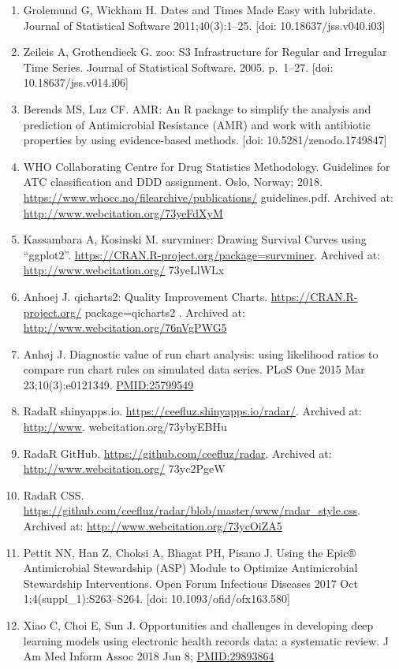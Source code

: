 \documentclass[
]{book}
\begin{document}
\begin{enumerate}
\item
  Grolemund G, Wickham H. Dates and Times Made Easy with lubridate. Journal of Statistical Software 2011;40(3):1--25. {[}doi: 10.18637/jss.v040.i03{]}
\item
  Zeileis A, Grothendieck G. zoo: S3 Infrastructure for Regular and Irregular Time Series. Journal of Statistical Software. 2005. p.~1--27. {[}doi: 10.18637/jss.v014.i06{]}
\item
  Berends MS, Luz CF. AMR: An R package to simplify the analysis and prediction of Antimicrobial Resistance (AMR) and work with antibiotic properties by using evidence-based methods. {[}doi: 10.5281/zenodo.1749847{]}
\item
  WHO Collaborating Centre for Drug Statistics Methodology. Guidelines for ATC classification and DDD assignment. Oslo, Norway; 2018. \url{https://www.whocc.no/filearchive/publications/} guidelines.pdf. Archived at: \url{http://www.webcitation.org/73yeFdXyM}
\item
  Kassambara A, Kosinski M. survminer: Drawing Survival Curves using ``ggplot2''. \url{https://CRAN.R-project.org/package=survminer}. Archived at: \url{http://www.webcitation.org/} 73yeLlWLx
\item
  Anhoej J. qicharts2: Quality Improvement Charts. \url{https://CRAN.R-project.org/} package=qicharts2 . Archived at: \url{http://www.webcitation.org/76nVgPWG5}
\item
  Anhøj J. Diagnostic value of run chart analysis: using likelihood ratios to compare run chart rules on simulated data series. PLoS One 2015 Mar 23;10(3):e0121349. \url{PMID:25799549}
\item
  RadaR shinyapps.io. \url{https://ceefluz.shinyapps.io/radar/}. Archived at: \url{http://www}. webcitation.org/73ybyEBHu
\item
  RadaR GitHub. \url{https://github.com/ceefluz/radar}. Archived at: \url{http://www.webcitation.org/} 73yc2PgeW
\item
  RadaR CSS. \url{https://github.com/ceefluz/radar/blob/master/www/radar_style.css}. Archived at: \url{http://www.webcitation.org/73ycOiZA5}
\item
  Pettit NN, Han Z, Choksi A, Bhagat PH, Pisano J. Using the Epic® Antimicrobial Stewardship (ASP) Module to Optimize Antimicrobial Stewardship Interventions. Open Forum Infectious Diseases 2017 Oct 1;4(suppl\_1):S263--S264. {[}doi: 10.1093/ofid/ofx163.580{]}
\item
  Xiao C, Choi E, Sun J. Opportunities and challenges in developing deep learning models using electronic health records data: a systematic review. J Am Med Inform Assoc 2018 Jun 8; \url{PMID:29893864}

\end{enumerate}
\end{document}
